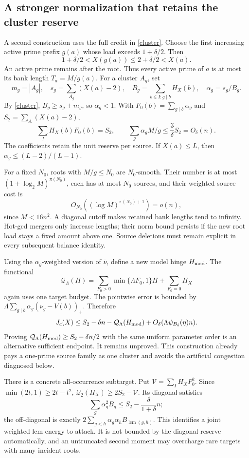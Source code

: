 \documentclass[11pt,a4paper]{article}
\begin{document}
\subsection{A stronger normalization that retains the cluster reserve}
A second construction uses the full credit in \eqref{cluster}. Choose the
first increasing active prime prefix $g(a)$ whose load exceeds
$1+\delta/2$. Then
\[
 1+\delta/2<X(g(a))\le2+\delta/2<X(a).
\]
An active prime remains after the root. Thus every active prime of $a$ is
at most its bank length $T_a=M/g(a)$. For a cluster $A_g$, set
\[
 m_g=|A_g|,\quad s_g=\sum_{A_g}(X(a)-2),\quad
 B_g=\sum_{b\in I:g\mid b}H_X(b),\quad\alpha_g=s_g/B_g.
\]
By \eqref{cluster}, $B_g\ge s_g+m_g$, so $\alpha_g<1$. With
$F_0(b)=\sum_{g\mid b}\alpha_g$ and $S_2=\sum_A(X(a)-2)$,
\begin{equation}
 \sum_IH_X(b)F_0(b)=S_2,\qquad
 \sum_g\alpha_gM/g\le\frac3\delta S_2=O_\delta(n).        \label{clusternorm}
\end{equation}
The coefficients retain the unit reserve per source. If $X(a)\le L$,
then $\alpha_g\le(L-2)/(L-1)$.

For a fixed $N_0$, roots with $M/g\le N_0$ are $N_0$-smooth. Their number is
at most $(1+\log_2M)^{\pi(N_0)}$, each has at most $N_0$ sources, and their
weighted source cost is
\[
 O_{N_0}((\log M)^{\pi(N_0)+1})=o(n),
\]
since $M<16n^2$. A diagonal cutoff makes retained bank lengths tend to infinity.
Hot-gcd mergers only increase lengths; their norm bound persists if the
new root load stays a fixed amount above one. Source deletions
must remain explicit in every subsequent balance identity.

Using the $\alpha_g$-weighted version of $\bar\nu$, define a new model hinge
$H_{\rm mod}$. The functional
\[
 \mathcal Q_\Lambda(H)=
 \sum_{F_0>0}\min\{\Lambda F_0,1\}H
 +\sum_{F_0=0}H_X
\]
again uses one target budget. The pointwise error is bounded by
$\Lambda\sum_{g\mid b}\alpha_g(\nu_g-V(b))_+$. Therefore
\begin{equation}
 J_c(X)\le S_2-\delta n-\mathcal Q_\Lambda(H_{\rm mod})
       +O_\delta(\Lambda\psi_{B_\delta}(\eta)n).          \label{clustertransfer}
\end{equation}
Proving $\mathcal Q_\Lambda(H_{\rm mod})\ge S_2-\delta n/2$ with the same
uniform parameter order is an alternative sufficient endpoint. It remains
unproved. This construction already pays a one-prime source family as one
cluster and avoids the artificial congestion diagnosed below.

There is a concrete all-occurrence subtarget. Put
$\mathcal V=\sum_IH_XF_0^2$. Since $\min(2t,1)\ge2t-t^2$,
$\mathcal Q_2(H_X)\ge2S_2-\mathcal V$. Its diagonal satisfies
\[
 \sum_g\alpha_g^2B_g
 \le S_2-\frac{\delta}{1+\delta}n;
\]
the off-diagonal is exactly
$2\sum_{g<h}\alpha_g\alpha_h B_{\operatorname{lcm}(g,h)}$.
This identifies a joint weighted lcm energy to attack. It is not bounded
by the diagonal reserve automatically, and an untruncated second moment
may overcharge rare targets with many incident roots.
\end{document}
